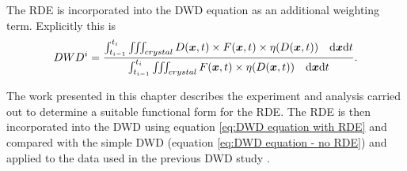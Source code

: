 The RDE is incorporated into the DWD equation as an additional weighting term.
Explicitly this is
\begin{equation}
    DWD^i = \frac{\int_{t_{i-1}}^{t_{i}} \iiint_{crystal} D(\boldsymbol{x},t) \times F(\boldsymbol{x},t) \times \eta(D(\boldsymbol{x},t)) \quad \mathrm{d}\boldsymbol{x}\mathrm{d} t}{\int_{t_{i-1}}^{t_{i}} \iiint_{crystal}F(\boldsymbol{x},t) \times \eta(D(\boldsymbol{x},t)) \quad \mathrm{d}\boldsymbol{x}\mathrm{d} t}.
    \label{eq:DWD equation with RDE}
\end{equation}

The work presented in this chapter describes the experiment and analysis carried out to determine a suitable functional form for the RDE.
The RDE is then incorporated into the DWD using equation \ref{eq:DWD equation with RDE} and compared with the simple DWD (equation \ref{eq:DWD equation - no RDE}) and applied to the data used in the previous DWD study \cite{zeldin2013dwd}.
